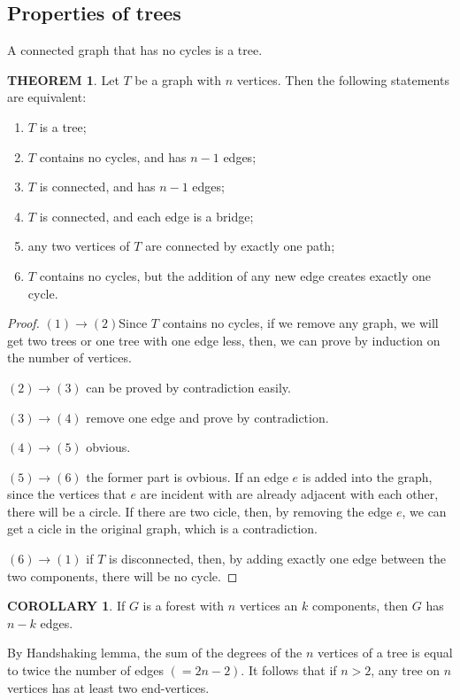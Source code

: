\documentclass[a4paper,11pt]{article}%
\theoremstyle{remark}
\theoremstyle{definition}
\newtheorem{theorem}{THEOREM}[section]
\theoremstyle{definition}
\newtheorem{corollary}{COROLLARY}[section]
\theoremstyle{definition}
\theoremstyle{definition}
\theoremstyle{plain}
\theoremstyle{definition}
\begin{document}
\subsection{Properties of trees}
A connected graph that has no cycles is a tree.
\begin{theorem}
    Let $T$ be a graph with $n$ vertices. Then the following statements are equivalent:
    \begin{enumerate}
        \item $T$ is a tree;
        \item $T$ contains no cycles, and has $n-1$ edges;
        \item $T$ is connected, and has $n-1$ edges;
        \item $T$ is connected, and each edge is a bridge;
        \item any two vertices of $T$ are connected by exactly one path;
        \item $T$ contains no cycles, but the addition of any new edge creates exactly one cycle.
    \end{enumerate}
\end{theorem}
\begin{proof}
    $(1)\rightarrow(2)$Since $T$ contains no cycles, if we remove any graph, we 
    will get two trees or one tree with one edge less, then, we can prove by induction on the number of vertices.

    $(2)\rightarrow(3)$ can be proved by contradiction easily.

    $(3)\rightarrow(4)$ remove one edge and prove by contradiction.

    $(4)\rightarrow(5)$ obvious.

    $(5)\rightarrow(6)$ the former part is ovbious. If an edge $e$ is 
    added into the graph, since the vertices that $e$ are incident with 
    are already adjacent with each other, there will be a circle.
    If there are two cicle, then, by removing the edge $e$, we can 
    get a cicle in the original graph, which is a contradiction.

    $(6)\rightarrow(1)$ if $T$ is disconnected, then, by adding exactly 
    one edge between the two components, there will be no cycle.
\end{proof}
\begin{corollary}
    If $G$ is a forest with $n$ vertices an $k$ components, then $G$ has $n-k$ edges.
\end{corollary}
By Handshaking lemma, the sum of the degrees of the $n$ vertices of a 
tree is equal to twice the number of edges $(=2n-2)$.  It follows that if $n>2$,
any tree on $n$ vertices has at least two end-vertices.
\end{document}
